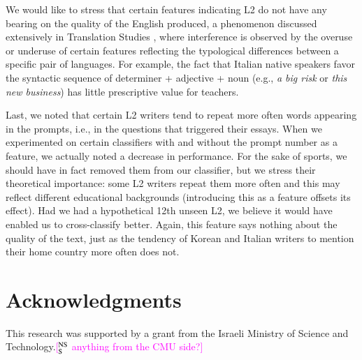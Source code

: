 \documentclass[11pt,letterpaper]{article}
\newcommand{\ensuretext}[1]{#1}
\newcommand{\nssmarker}{\ensuretext{\textcolor{magenta}{\ensuremath{^{\textsc{NS}}_{\textsc{S}}}}}}
\newcommand{\arkcomment}[3]{\ensuretext{\textcolor{#3}{[#1 #2]}}}
\newcommand{\nss}[1]{\arkcomment{\nssmarker}{#1}{magenta}}
\newcommand{\textnl}{\textsl}
\begin{document}
We would like to stress that certain features indicating L2 do not have any bearing on the quality of the English produced, a phenomenon discussed extensively in Translation Studies \citep{Toury:1995}, where interference is observed by the overuse or underuse of certain features reflecting the typological differences between a specific pair of languages. For example, the fact that Italian native speakers favor the syntactic sequence of determiner + adjective + noun (e.g., \textnl{a big risk} or \textnl{this new business}) has little prescriptive value for teachers.

Last, we noted that certain L2 writers tend to repeat more often words appearing in the prompts, i.e., in the questions that triggered their essays. When we experimented on certain classifiers with and without the prompt number as a feature, we actually noted a decrease in performance. For the sake of sports, we should have in fact removed them from our classifier, but we stress their theoretical importance: some L2 writers repeat them more often and this may reflect different educational backgrounds (introducing this as a feature offsets its effect). Had we had a hypothetical 12th unseen L2, we believe it would have enabled us to cross-classify better. Again, this feature says nothing about the quality of the text, just as the tendency of Korean and Italian writers to mention their home country more often does not.

\section*{Acknowledgments}
This research was supported by a grant from the Israeli Ministry of
Science and Technology.\nss{anything from the CMU side?}




\end{document}
